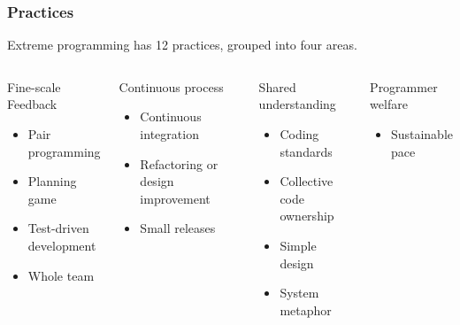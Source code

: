 \begin{frame}
    \frametitle{Practices}
    Extreme programming has 12 practices, grouped into four areas.
    \begin{columns}
        \begin{block}{Fine-scale Feedback}
            \begin{itemize}
                \item Pair programming
                \item Planning game
                \item Test-driven development
                \item Whole team
            \end{itemize}
        \end{block}\pause
        \begin{block}{Continuous process}
            \begin{itemize}
                \item Continuous integration
                \item Refactoring or design improvement
                \item Small releases
            \end{itemize}
        \end{block}\pause
        \begin{block}{Shared understanding}
            \begin{itemize}
                \item Coding standards
                \item Collective code ownership
                \item Simple design
                \item System metaphor
            \end{itemize}
        \end{block}\pause
        \begin{block}{Programmer welfare}
            \begin{itemize}
                \item Sustainable pace
            \end{itemize}
        \end{block}
    \end{columns}
\end{frame}